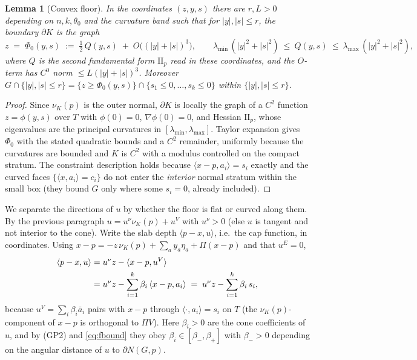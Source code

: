 \documentclass[11pt]{article}
\newtheorem{lemma}[theorem]{Lemma}
\theoremstyle{definition}
\theoremstyle{remark}
\newcommand{\nor}{\nu_K}
\begin{document}
\begin{lemma}[Convex floor]\label{lem:floor}
In the coordinates $(z,y,s)$ there are $r,L>0$ depending on $n,k,\theta_0$ and
the curvature band such that for $|y|,|s|\le r$, the boundary $\partial K$ is
the graph
\[
z\;=\;\Phi_0(y,s)\;:=\;\tfrac12\,Q(y,s)\;+\;O\!\bigl((|y|+|s|)^3\bigr),
\qquad
\lambda_{\min}\,(|y|^2+|s|^2)\ \le\ Q(y,s)\ \le\ \lambda_{\max}\,(|y|^2+|s|^2),
\]
where $Q$ is the second fundamental form $\mathrm{I\!I}_p$ read in these
coordinates, and the $O$-term has $C^0$ norm $\le L(|y|+|s|)^3$.  Moreover
$G\cap\{|y|,|s|\le r\}=\{z\ge\Phi_0(y,s)\}\cap\{s_1\le0,\dots,s_k\le0\}$ within
$\{|y|,|s|\le r\}$.
\end{lemma}

\begin{proof}
Since $\nor(p)$ is the outer normal, $\partial K$ is locally the graph of a
$C^2$ function $z=\phi(y,s)$ over $T$ with $\phi(0)=0$, $\nabla\phi(0)=0$, and
Hessian $\mathrm{I\!I}_p$, whose eigenvalues are the principal curvatures in
$[\lambda_{\min},\lambda_{\max}]$.  Taylor expansion gives $\Phi_0$ with the
stated quadratic bounds and a $C^2$ remainder, uniformly because the curvatures
are bounded and $K$ is $C^2$ with a modulus controlled on the compact stratum.
The constraint description holds because $\langle x-p,a_i\rangle=s_i$ exactly
and the curved faces $\{\langle x,a_i\rangle=c_i\}$ do not enter the
\emph{interior} normal stratum within the small box (they bound $G$ only where
some $s_i=0$, already included).
\end{proof}

We separate the directions of $u$ by whether the floor is flat or curved along
them.  By the previous paragraph $u=u^\nu\nor(p)+u^V$ with $u^\nu>0$ (else $u$
is tangent and not interior to the cone).  Write the slab depth
$\langle p-x,u\rangle$, i.e.\ the cap function, in coordinates.  Using
$x-p=-z\,\nor(p)+\sum_a y_a\eta_a+\Pi(x-p)$ and that $u^E=0$,
\begin{align}
\langle p-x,u\rangle
&=u^\nu z-\langle x-p,u^V\rangle \notag\\
&=u^\nu z-\sum_{i=1}^k\beta_i\,\langle x-p,a_i\rangle
\;=\;u^\nu z-\sum_{i=1}^k\beta_i\,s_i,
\label{eq:capfun}
\end{align}
because $u^V=\sum_i\beta_i\bar a_i$ pairs with $x-p$ through
$\langle\cdot,a_i\rangle=s_i$ on $T$ (the $\nor(p)$-component of $x-p$ is
orthogonal to $\Pi V$).  Here $\beta_i>0$ are the cone coefficients of $u$, and
by (GP2) and \eqref{eq:fbound} they obey $\beta_i\in[\beta_-,\beta_+]$ with
$\beta_->0$ depending on the angular distance of $u$ to $\partial N(G,p)$.
\end{document}
